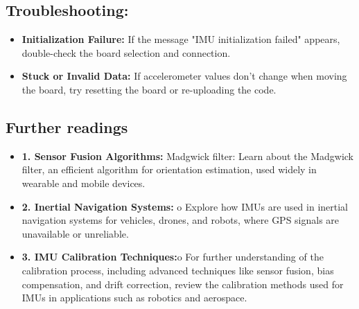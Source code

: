 \subsection*{Troubleshooting:}

\begin{itemize}
	\item \textbf{Initialization Failure:} If the message "IMU initialization failed" appears, double-check the board selection and connection.
	\item \textbf{Stuck or Invalid Data:} If accelerometer values don’t change when moving the board, try resetting the board or re-uploading the code\cite{Arduino:2024h}.
\end{itemize}


\subsection*{Further readings}
\begin{itemize}
	\item\textbf{1.	Sensor Fusion Algorithms:} Madgwick filter: Learn about the Madgwick filter, an efficient algorithm for orientation estimation, used widely in wearable and mobile devices\cite{Madgwick:2010}.
	\item\textbf{2.	Inertial Navigation Systems:} o	Explore how IMUs are used in inertial navigation systems for vehicles, drones, and robots, where GPS signals are unavailable or unreliable\cite{Jung:2018}.
	\item\textbf{3.	IMU Calibration Techniques:}o	For further understanding of the calibration process, including advanced techniques like sensor fusion, bias compensation, and drift correction, review the calibration methods used for IMUs in applications such as robotics and aerospace\cite{Oh:2017}.
	
\end{itemize}










